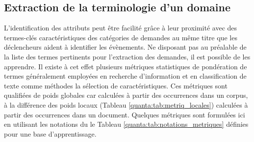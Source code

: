 \subsection{Extraction de la terminologie d'un domaine}
L'identification des attributs peut être facilité grâce à leur proximité avec des termes-clés caractéristiques des catégories de demandes au même titre que les \og déclencheurs \fg{} aident à identifier les évènements.
Ne disposant pas au préalable de la liste des termes pertinents pour l'extraction des demandes, il est possible de les apprendre. Il existe à cet effet plusieurs métriques statistiques de pondération de termes généralement  employées en recherche d'information et en classification de texte comme méthodes la sélection de caractéristiques. Ces métriques sont qualifiées de poids globales car calculées à partir des occurrences dans un corpus, à la différence des poids locaux (Tableau \ref{quanta:tab:metriq_locales}) calculées à partir des occurrences dans un document. Quelques métriques sont formulées ici en utilisant les notations du le Tableau \ref{quanta:tab:notations_metriques} définies pour une base d'apprentissage.


